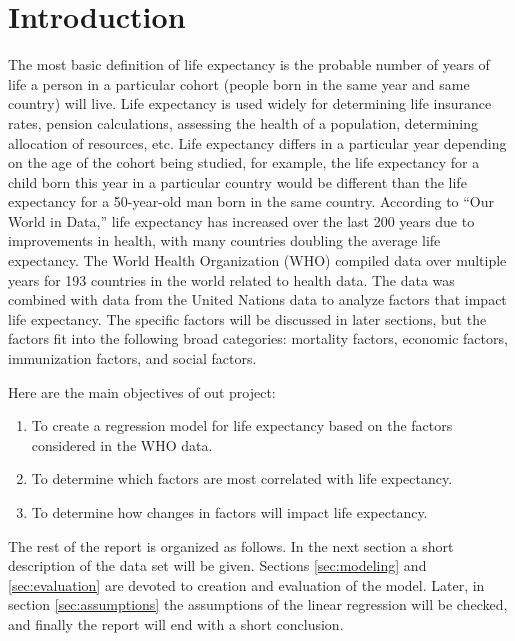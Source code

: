 \section{Introduction}
The most basic definition of life expectancy is the probable number of years of life a person in a particular cohort (people born in the same year and same country) will live. Life expectancy is used widely for determining life insurance rates, pension calculations, assessing the health of a population, determining allocation of resources, etc. Life expectancy differs in a particular year depending on the age of the cohort being studied, for example, the life expectancy for a child born this year in a particular country would be different than the life expectancy for a 50-year-old man born in the same country. According to “Our World in Data,” \cite{owidlifeexpectancy} life expectancy has increased over the last 200 years due to improvements in health, with many countries doubling the average life expectancy. 
The World Health Organization (WHO) compiled data over multiple years for 193 countries in the world related to health data. The data was combined with data from the United Nations data to analyze factors that impact life expectancy. The specific factors will be discussed in later sections, but the factors fit into the following broad categories: mortality factors, economic factors, immunization factors, and social factors. 

Here are the main objectives of out project:
\begin{enumerate}
\item To create a regression model for life expectancy based on the factors considered in the WHO data.
\item To determine which factors are most correlated with life expectancy.
\item To determine how changes in factors will impact life expectancy.   
\end{enumerate}

The rest of the report is organized as follows. In the next section a short description of the data set will be given. Sections \ref{sec:modeling} and \ref{sec:evaluation} are devoted to creation  and evaluation of the model. Later, in section \ref{sec:assumptions} the assumptions of the linear regression will be checked, and finally the report will end with a short conclusion.

